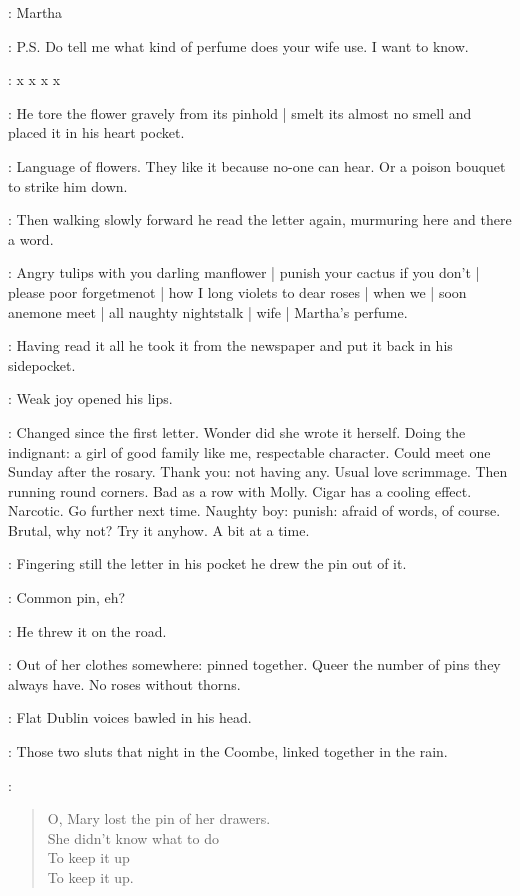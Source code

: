 \martha:
Martha

\martha:
P.S. Do tell me what kind of perfume does your wife use.
I want to know.

\martha: x x x x

:
He tore the flower gravely from its pinhold |
smelt its almost no smell
and placed it in his heart pocket.

\BloomInt:
Language of flowers.
They like it
because no-one can hear.
Or a poison bouquet to strike him down.

:
Then walking slowly forward
he read the letter again,
murmuring here and there a word.

\BloomInt:
Angry tulips with you darling manflower |
punish your cactus if you don't |
please poor forgetmenot |
how I long violets to dear roses |
when we |
soon anemone meet |
all naughty nightstalk |
wife |
Martha's perfume.

:
Having read it all
he took it from the newspaper and put it back in his sidepocket.

:
Weak joy opened his lips.

\BloomInt:
Changed since the first letter.
Wonder did she wrote it herself.
Doing the indignant:
a girl of good family like me, respectable character.
Could meet one Sunday after the rosary.
Thank you: not having any.
Usual love scrimmage.
Then running round corners.
Bad as a row with Molly.
Cigar has a cooling effect.
Narcotic.
Go further next time.
Naughty boy:
punish:
afraid of words, of course.
Brutal, why not?
Try it anyhow.
A bit at a time.

:
Fingering still the letter in his pocket
he drew the pin out of it.

\BloomInt:
Common pin, eh?

:
He threw it on the road.

\BloomInt:
Out of her clothes somewhere:
pinned together.
Queer the number of pins they always have.
No roses without thorns.

:
Flat Dublin voices bawled in his head.

\BloomInt:
Those two sluts that night in the Coombe,
linked together in the rain.

\sluts:
\begin{verse}
    O, Mary lost the pin of her drawers. \\
    She didn't know what to do \\
    To keep it up \\
    To keep it up.
\end{verse}

